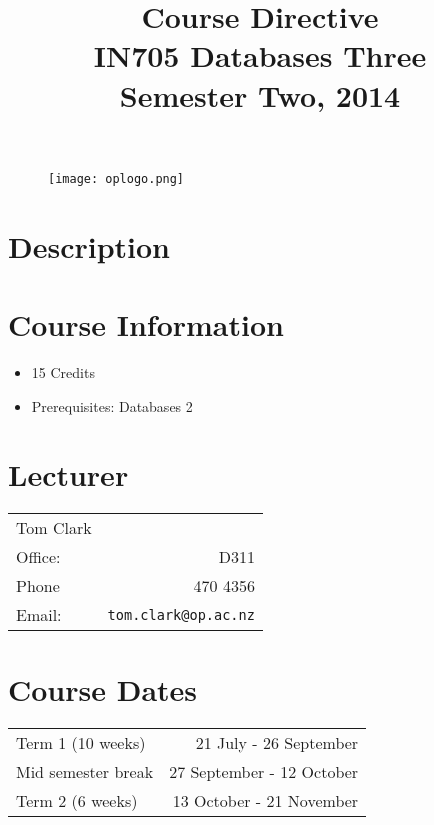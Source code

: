 \documentclass{article}
\begin{document}
\begin{figure}
\texttt{[image: oplogo.png]}
\end{figure}

\title{Course Directive\\IN705 Databases Three\\Semester Two, 2014}
\date{}
\maketitle

\section*{Description}

\section*{Course Information}
\begin{itemize}
  \item 15 Credits
  \item Prerequisites: Databases 2
\end{itemize}

\section*{Lecturer}
\begin{tabular}{lr}

  Tom Clark &    \\
     Office: & D311 \\
     Phone & 470 4356 \\
     Email: & \texttt{tom.clark@op.ac.nz} \\
\end{tabular}

\section*{Course Dates}
\begin{tabular}{lr}
Term 1 (10 weeks) & 21 July - 26 September \\
Mid semester break & 27 September - 12 October \\
Term 2 (6 weeks) & 13 October - 21 November \\
\end{tabular}
\end{document}
